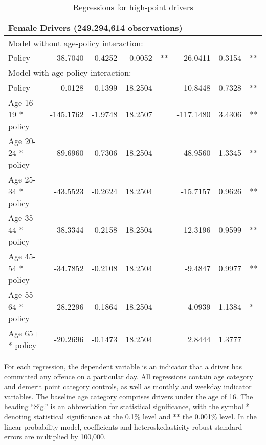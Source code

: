 \begin{table}
\begin{tabular}{l r r r l r r l}
\hline 

\multicolumn{7}{l}{\textbf{Female Drivers} (249,294,614 observations)} \\ 

\hline
\multicolumn{7}{l}{Model without age-policy interaction: } \\ 
Policy                   &  -38.7040       &  -0.4252        &  0.0052       &   **       &  -26.0411        &  0.3154       &   **       \\ 
\hline
\multicolumn{7}{l}{Model with age-policy interaction: } \\ 
Policy                   &  -0.0128       &  -0.1399        &  18.2504       &            &  -10.8448        &  0.7328       &   **       \\ 
Age 16-19 * policy   &  -145.1762       &  -1.9748        &  18.2507       &            &  -117.1480        &  3.4306       &   **       \\ 
Age 20-24 * policy   &  -89.6960       &  -0.7306        &  18.2504       &            &  -48.9560        &  1.3345       &   **       \\ 
Age 25-34 * policy   &  -43.5523       &  -0.2624        &  18.2504       &            &  -15.7157        &  0.9626       &   **       \\ 
Age 35-44 * policy   &  -38.3344       &  -0.2158        &  18.2504       &            &  -12.3196        &  0.9599       &   **       \\ 
Age 45-54 * policy   &  -34.7852       &  -0.2108        &  18.2504       &            &  -9.4847        &  0.9977       &   **       \\ 
Age 55-64 * policy   &  -28.2296       &  -0.1864        &  18.2504       &            &  -4.0939        &  1.1384       &    *       \\ 
Age 65+ * policy   &  -20.2696       &  -0.1473        &  18.2504       &            &  2.8444        &  1.3777       &            \\ 

\hline 

\end{tabular} 
\caption{Regressions for high-point drivers} 
For each regression, the dependent variable is an indicator that a driver has committed  
any offence on a particular day.  
All regressions contain age category and demerit point category controls, 
as well as monthly and weekday indicator variables. 
The baseline age category comprises drivers under the age of 16. 
The heading ``Sig.'' is an abbreviation for statistical significance, with 
the symbol * denoting statistical significance at the 0.1\% level 
and ** the 0.001\% level. 
In the linear probability model, coefficients and heteroskedasticity-robust standard errors are  
multiplied by 100,000.  
\label{tab:seas_Logit_vs_LPMx100K_high_pt_regs} 
\end{table} 
 
